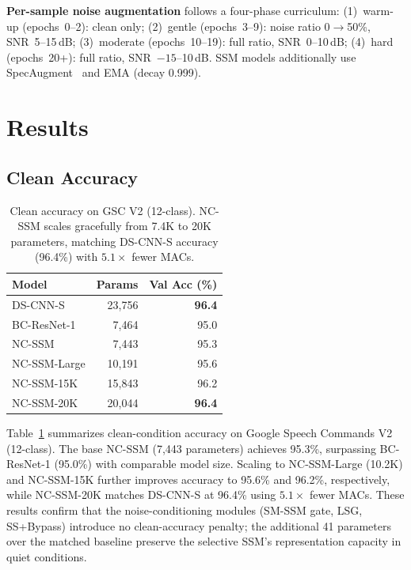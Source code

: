 \documentclass[journal]{IEEEtran}
\begin{document}
\textbf{Per-sample noise augmentation} follows a four-phase curriculum:
(1)~warm-up (epochs~0--2): clean only;
(2)~gentle (epochs~3--9): noise ratio 0$\to$50\%, SNR~5--15\,dB;
(3)~moderate (epochs~10--19): full ratio, SNR~0--10\,dB;
(4)~hard (epochs~20+): full ratio, SNR~$-15$--10\,dB.
SSM models additionally use SpecAugment~\cite{park2019specaugment} and EMA (decay 0.999).



\section{Results}
\label{sec:results}

\subsection{Clean Accuracy}

\begin{table}[t]
\centering
\caption{Clean accuracy on GSC V2 (12-class). NC-SSM scales gracefully from 7.4K to 20K parameters, matching DS-CNN-S accuracy (96.4\%) with $5.1\times$ fewer MACs.}
\label{tab:clean}
\small
\begin{tabular}{lrr}
\toprule
\textbf{Model} & \textbf{Params} & \textbf{Val Acc (\%)} \\
\midrule
DS-CNN-S & 23{,}756 & \textbf{96.4} \\
BC-ResNet-1 & 7{,}464 & 95.0 \\
\midrule
NC-SSM & 7{,}443 & 95.3 \\
NC-SSM-Large & 10{,}191 & 95.6 \\
NC-SSM-15K & 15{,}843 & 96.2 \\
NC-SSM-20K & 20{,}044 & \textbf{96.4} \\
\bottomrule
\end{tabular}
\end{table}

Table~\ref{tab:clean} summarizes clean-condition accuracy on Google Speech Commands V2 (12-class).
The base NC-SSM (7,443 parameters) achieves 95.3\%, surpassing BC-ResNet-1 (95.0\%) with comparable model size.
Scaling to NC-SSM-Large (10.2K) and NC-SSM-15K further improves accuracy to 95.6\% and 96.2\%, respectively,
while NC-SSM-20K matches DS-CNN-S at 96.4\% using $5.1\times$ fewer MACs.
These results confirm that the noise-conditioning modules (SM-SSM gate, LSG, SS+Bypass) introduce no clean-accuracy penalty;
the additional 41 parameters over the matched baseline preserve the selective SSM's representation capacity in quiet conditions.
\end{document}
